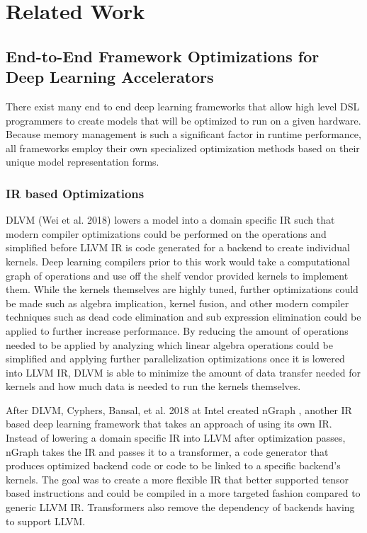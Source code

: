 
\chapter{Related Work} %

\label{Chapter3} %

\section{End-to-End Framework Optimizations for Deep Learning Accelerators}
There exist many end to end deep learning frameworks that allow
high level DSL programmers to create models that will be optimized to run
on a given hardware. Because memory management is such a significant
factor in runtime performance, all frameworks employ their own specialized
optimization methods based on their unique model representation forms.

\subsection{IR based Optimizations}
DLVM \cite{DLVM} (Wei et al. 2018) lowers a model into a domain specific IR
such that modern compiler optimizations could be performed on the operations
and simplified before LLVM IR is code generated for a backend to create
individual kernels. Deep learning compilers \cite{tensorflow} \cite{torch}
prior to this work would take a computational graph of operations and use off
the shelf vendor provided kernels to implement them. While the kernels
themselves are highly tuned, further optimizations could be made such as
algebra implication, kernel fusion, and other modern compiler techniques such
as dead code elimination and sub expression elimination could be applied to
further increase performance. By reducing the amount of operations needed to be
applied by analyzing which linear algebra operations could be simplified and
applying further parallelization optimizations once it is lowered into LLVM IR,
DLVM is able to minimize the amount of data transfer needed for kernels and how
much data is needed to run the kernels themselves.

After DLVM, Cyphers, Bansal, et al. 2018 at Intel created nGraph \cite{nGraph},
another IR based deep learning framework that takes an approach of using its
own IR. Instead of lowering a domain specific IR into LLVM after optimization
passes, nGraph takes the IR and passes it to a transformer, a code generator
that produces optimized backend code or code to be linked to a specific
backend's kernels. The goal was to create a more flexible IR that better supported
tensor based instructions and could be compiled in a more targeted fashion compared
to generic LLVM IR. Transformers also remove the dependency of backends having
to support LLVM.

